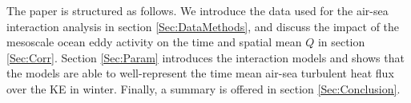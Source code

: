   





The paper is structured as follows. We introduce the data used for the air-sea interaction analysis in section \ref{Sec:DataMethods}, and discuss the impact of the mesoscale ocean eddy activity on the time and spatial mean $Q$ in section \ref{Sec:Corr}. Section \ref{Sec:Param} introduces the interaction models and shows that the models are able to well-represent the time mean air-sea turbulent heat flux over the KE in winter. Finally, a summary is offered in section \ref{Sec:Conclusion}.  

